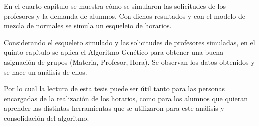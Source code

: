 En el cuarto capítulo se muestra cómo se simularon las solicitudes de los profesores y la demanda de alumnos. Con dichos resultados y con el modelo de mezcla de normales se simula un esqueleto de horarios.

Considerando el esqueleto simulado y las solicitudes de profesores simuladas, en el quinto capítulo se aplica el Algoritmo Genético para obtener una buena asignación de grupos (Materia, Profesor, Hora). Se observan los datos obtenidos y se hace un análisis de ellos. %


Por lo cual la lectura de esta tesis puede ser útil tanto para las personas encargadas de la realización de los horarios, como para los alumnos que quieran aprender las distintas herramientas que se utilizaron para este análisis y consolidación del algoritmo.
